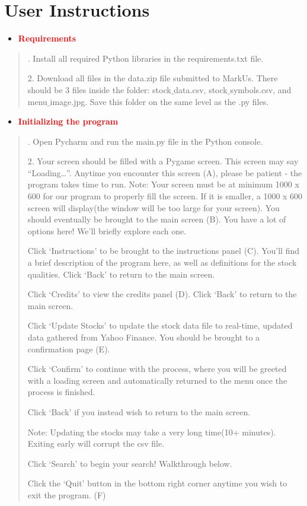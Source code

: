 \documentclass[fontsize=12pt]{article}
\begin{document}
\section*{User Instructions}
\begin{itemize}
\item
\textbf{\textcolor{red}{Requirements}}
\end{itemize}
\begin{quote}
. Install all required Python libraries in the requirements.txt file.

2. Download all files in the data.zip file submitted to MarkUs. There should be 3 files inside the folder: stock$\_$data.csv, stock$\_$symbols.csv, and menu$\_$image.jpg.  Save this folder on the same level as the .py files.
\end{quote}
\begin{itemize}
\item
\textbf{\textcolor{red}{Initializing the program}}
\end{itemize}
\begin{quote}
. Open Pycharm and run the main.py file in the Python console.

2. Your screen should be filled with a Pygame screen. This screen may say “Loading…”. Anytime you encounter this screen (A), please be patient - the program takes time to run.
Note: Your screen must be at minimum 1000 x 600 for our program to properly fill the screen. If it is smaller, a 1000 x 600 screen will display(the window will be too large for your screen).
You should eventually be brought to the main screen (B). You have a lot of options here! We’ll briefly explore each one.

Click ‘Instructions’ to be brought to the instructions panel (C). You’ll find a brief description of the program here, as well as definitions for the stock qualities. Click ‘Back’ to return to the main screen.

Click ‘Credits’ to view the credits panel (D). Click ‘Back’ to return to the main screen.

Click ‘Update Stocks’ to update the stock data file to real-time, updated data gathered from Yahoo Finance. You should be brought to a confirmation page (E). 

Click ‘Confirm’ to continue with the process, where you will be greeted with a loading screen and automatically returned to the menu once the process is finished. 

Click ‘Back’ if you instead wish to return to the main screen.

Note: Updating the stocks may take a very long time(10+ minutes). Exiting early will corrupt the csv file.

Click ‘Search’ to begin your search! Walkthrough below.

Click the ‘Quit’ button in the bottom right corner anytime you wish to exit the program. (F)
\end{quote}
\end{document}
